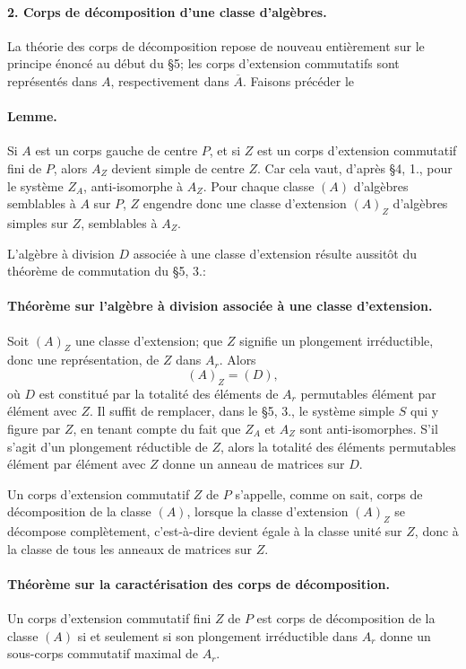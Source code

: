 \paragraph{2. Corps de décomposition d'une classe d'algèbres.}
La théorie des corps de décomposition repose de nouveau entièrement sur le principe énoncé au début du \S 5; les corps d'extension commutatifs sont représentés dans \(A\), respectivement dans \(\overline A\). Faisons précéder le

\paragraph{Lemme.}
Si \(A\) est un corps gauche de centre \(P\), et si \(Z\) est un corps d'extension commutatif fini de \(P\), alors \(A_Z\) devient simple de centre \(Z\). Car cela vaut, d'après \S 4, 1., pour le système \(Z_A\), anti-isomorphe à \(A_Z\). Pour chaque classe \((A)\) d'algèbres semblables à \(A\) sur \(P\), \(Z\) engendre donc une classe d'extension \((A)_Z\) d'algèbres simples sur \(Z\), semblables à \(A_Z\).

L'algèbre à division \(D\) associée à une classe d'extension résulte aussitôt du théorème de commutation du \S 5, 3.:

\paragraph{Théorème sur l'algèbre à division associée à une classe d'extension.}
Soit \((A)_Z\) une classe d'extension; que \(Z\) signifie un plongement irréductible, donc une représentation, de \(Z\) dans \(A_r\). Alors
\[
        (A)_Z=(D),
\]
où \(D\) est constitué par la totalité des éléments de \(A_r\) permutables élément par élément avec \(Z\). Il suffit de remplacer, dans le \S 5, 3., le système simple \(S\) qui y figure par \(Z\), en tenant compte du fait que \(Z_A\) et \(A_Z\) sont anti-isomorphes. S'il s'agit d'un plongement réductible de \(Z\), alors la totalité des éléments permutables élément par élément avec \(Z\) donne un anneau de matrices sur \(D\).

Un corps d'extension commutatif \(Z\) de \(P\) s'appelle, comme on sait, corps de décomposition de la classe \((A)\), lorsque la classe d'extension \((A)_Z\) se décompose complètement, c'est-à-dire devient égale à la classe unité sur \(Z\), donc à la classe de tous les anneaux de matrices sur \(Z\).

\paragraph{Théorème sur la caractérisation des corps de décomposition.}
Un corps d'extension commutatif fini \(Z\) de \(P\) est corps de décomposition de la classe \((A)\) si et seulement si son plongement irréductible dans \(A_r\) donne un sous-corps commutatif maximal de \(A_r\).

